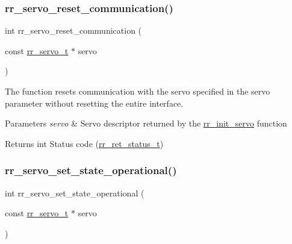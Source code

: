 \subsubsection{\texorpdfstring{rr\+\_\+servo\+\_\+reset\+\_\+communication()}{rr\_servo\_reset\_communication()}}
{\footnotesize\ttfamily int rr\+\_\+servo\+\_\+reset\+\_\+communication (\begin{DoxyParamCaption}\item[{const \hyperlink{structrr__servo__t}{rr\+\_\+servo\+\_\+t} $\ast$}]{servo }\end{DoxyParamCaption})}



The function resets communication with the servo specified in the \textquotesingle{}servo\textquotesingle{} parameter without resetting the entire interface. 


\begin{DoxyParams}{Parameters}
{\em servo} & Servo descriptor returned by the \hyperlink{group___common_ga0adb313a3eeb8a4399431e940a1f3e9e}{rr\+\_\+init\+\_\+servo} function \\
\hline
\end{DoxyParams}
\begin{DoxyReturn}{Returns}
int Status code (\hyperlink{api_8h_a92d5be5038abcf89837faf85a08debdc}{rr\+\_\+ret\+\_\+status\+\_\+t}) 
\end{DoxyReturn}
\mbox{\label{group___system__control_ga799d61d6eb811cba7f9097a5d9bfd0a8}} 
\subsubsection{\texorpdfstring{rr\+\_\+servo\+\_\+set\+\_\+state\+\_\+operational()}{rr\_servo\_set\_state\_operational()}}
{\footnotesize\ttfamily int rr\+\_\+servo\+\_\+set\+\_\+state\+\_\+operational (\begin{DoxyParamCaption}\item[{const \hyperlink{structrr__servo__t}{rr\+\_\+servo\+\_\+t} $\ast$}]{servo }\end{DoxyParamCaption})}



